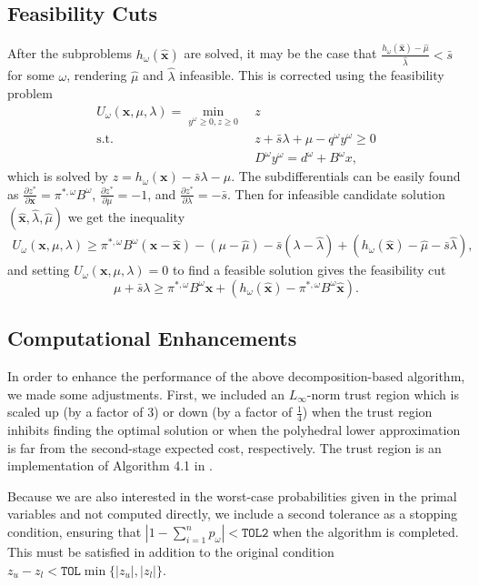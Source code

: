 \documentclass[ijoc,letterpaper]{informs3} %
\newcommand{\x}{\mathbf{x}}
\newcommand{\xh}{\hat{\x}}
\newcommand{\lh}{\hat{\lambda}}
\newcommand{\mh}{\hat{\mu}}
\newcommand{\st}{\mbox{s.t.}}
\begin{document}
\subsection{Feasibility Cuts}
After the subproblems $h_\omega(\xh)$ are solved, it may be the case that $\frac{h_\omega(\xh)-\mh}{\lh} < \bar{s}$ for some $\omega$, rendering $\mh$ and $\lh$ infeasible.
This is corrected using the feasibility problem
\begin{align*}
	U_\omega(\x,\mu,\lambda) = \min_{y^\omega \geq 0, z \geq 0} \ & z \\
	\st \ & z + \bar{s}\lambda + \mu - q^\omega y^\omega \geq 0 \\
	& D^\omega y^\omega = d^\omega + B^\omega x,
\end{align*}
which is solved by $z = h_\omega(\x) - \bar{s}\lambda - \mu$.
The subdifferentials can be easily found as $\frac{\partial z^*}{\partial \x} = \pi^{*,\omega} B^\omega$, $\frac{\partial z^*}{\partial \mu} = -1$, and $\frac{\partial z^*}{\partial \lambda} = -\bar{s}$.
Then for infeasible candidate solution $(\xh,\lh,\mh)$ we get the inequality
\begin{align*}
	U_\omega(\x,\mu,\lambda) \geq \pi^{*,\omega}B^\omega(\x-\xh) - (\mu -\mh) - \bar{s}(\lambda - \lh) + (h_\omega(\xh) - \mh - \bar{s}\lh),
\end{align*}
and setting $U_\omega(\x,\mu,\lambda) = 0$ to find a feasible solution gives the feasibility cut
\[
	\mu + \bar{s} \lambda \geq \pi^{*,\omega}B^\omega \x + (h_\omega(\xh) - \pi^{*,\omega}B^\omega\xh).
\]

\subsection{Computational Enhancements}

In order to enhance the performance of the above decomposition-based algorithm, we made some adjustments.
First, we included an $L_\infty$-norm trust region which is scaled up (by a factor of $3$) or down (by a factor of $\tfrac{1}{4}$) when the trust region inhibits finding the optimal solution or when the polyhedral lower approximation is far from the second-stage expected cost, respectively.
The trust region is an implementation of Algorithm 4.1 in \cite{nocedal1999numerical}.

Because we are also interested in the worst-case probabilities given in the primal variables and not computed directly, we include a second tolerance as a stopping condition, ensuring that $\left| 1 - \sum_{i=1}^n p_\omega \right| < \texttt{TOL2}$ when the algorithm is completed.
This must be satisfied in addition to the original condition $z_u - z_l < \texttt{TOL}\min\{|z_u|,|z_l|\}$.
\end{document}
